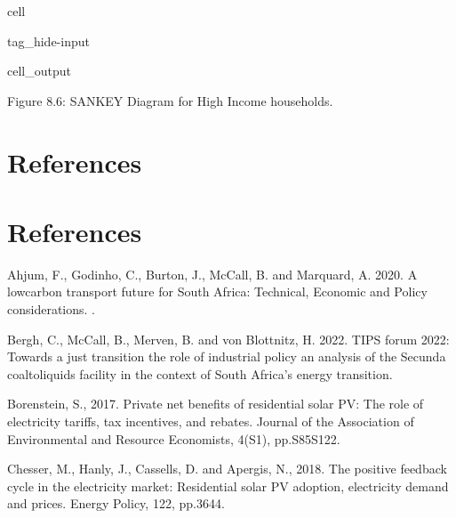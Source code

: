 \documentclass[letterpaper,10pt,english]{jupyterBook}
\begin{document}
\begin{sphinxuseclass}{cell}
\begin{sphinxuseclass}{tag_hide-input}\begin{sphinxVerbatimOutput}

\begin{sphinxuseclass}{cell_output}
\noindent{}

\end{sphinxuseclass}\end{sphinxVerbatimOutput}

\end{sphinxuseclass}
\end{sphinxuseclass}
\sphinxAtStartPar
Figure 8.6: SANKEY Diagram for High Income households.

\sphinxstepscope


\chapter{References}
\label{\detokenize{99refs:references}}\label{\detokenize{99refs::doc}}

\chapter{References}
\label{\detokenize{99refs:id1}}
\sphinxAtStartPar
Ahjum, F., Godinho, C., Burton, J., McCall, B. and Marquard, A. 2020. A low\sphinxhyphen{}carbon transport future for South Africa: Technical, Economic and Policy considerations. .

\sphinxAtStartPar
Bergh, C., McCall, B., Merven, B. and von Blottnitz, H. 2022. TIPS forum 2022: Towards a just transition the role of industrial policy an analysis of the Secunda coal\sphinxhyphen{}to\sphinxhyphen{}liquids facility in the context of South Africa’s energy transition.

\sphinxAtStartPar
Borenstein, S., 2017. Private net benefits of residential solar PV: The role of electricity tariffs, tax incentives, and rebates. Journal of the Association of Environmental and Resource Economists, 4(S1), pp.S85\sphinxhyphen{}S122.

\sphinxAtStartPar
Chesser, M., Hanly, J., Cassells, D. and Apergis, N., 2018. The positive feedback cycle in the electricity market: Residential solar PV adoption, electricity demand and prices. Energy Policy, 122, pp.36\sphinxhyphen{}44.
\end{document}
